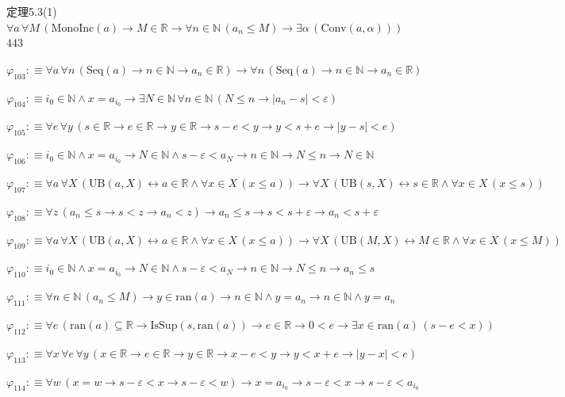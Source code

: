 \begin{fullproof}{定理5.3(1)}{$\forall a\,\forall M\,(\mathrm{MonoInc}(a) \to M \in \mathbb{R} \to \forall n \in \mathbb{N}\,(a_{n} \leq M) \to \exists \alpha\,(\mathrm{Conv}(a,\alpha)))$}{443}
\begin{abbrevlist}
\item $\varphi_{103} :\equiv \forall a\,\forall n\,(\mathrm{Seq}(a) \to n \in \mathbb{N} \to a_{n} \in \mathbb{R}) \to \forall n\,(\mathrm{Seq}(a) \to n \in \mathbb{N} \to a_{n} \in \mathbb{R})$
\item $\varphi_{104} :\equiv i_{0} \in \mathbb{N} \land x = a_{i_{0}} \to \exists N \in \mathbb{N}\,\forall n \in \mathbb{N}\,(N \leq n \to \lvert a_{n} - s \rvert < \varepsilon)$
\item $\varphi_{105} :\equiv \forall e\,\forall y\,(s \in \mathbb{R} \to e \in \mathbb{R} \to y \in \mathbb{R} \to s - e < y \to y < s + e \to \lvert y - s \rvert < e)$
\item $\varphi_{106} :\equiv i_{0} \in \mathbb{N} \land x = a_{i_{0}} \to N \in \mathbb{N} \land s - \varepsilon < a_{N} \to n \in \mathbb{N} \to N \leq n \to N \in \mathbb{N}$
\item $\varphi_{107} :\equiv \forall a\,\forall X\,(\mathrm{UB}(a,X) \leftrightarrow a \in \mathbb{R} \land \forall x \in X\,(x \leq a)) \to \forall X\,(\mathrm{UB}(s,X) \leftrightarrow s \in \mathbb{R} \land \forall x \in X\,(x \leq s))$
\item $\varphi_{108} :\equiv \forall z\,(a_{n} \leq s \to s < z \to a_{n} < z) \to a_{n} \leq s \to s < s + \varepsilon \to a_{n} < s + \varepsilon$
\item $\varphi_{109} :\equiv \forall a\,\forall X\,(\mathrm{UB}(a,X) \leftrightarrow a \in \mathbb{R} \land \forall x \in X\,(x \leq a)) \to \forall X\,(\mathrm{UB}(M,X) \leftrightarrow M \in \mathbb{R} \land \forall x \in X\,(x \leq M))$
\item $\varphi_{110} :\equiv i_{0} \in \mathbb{N} \land x = a_{i_{0}} \to N \in \mathbb{N} \land s - \varepsilon < a_{N} \to n \in \mathbb{N} \to N \leq n \to a_{n} \leq s$
\item $\varphi_{111} :\equiv \forall n \in \mathbb{N}\,(a_{n} \leq M) \to y \in \mathrm{ran}(a) \to n \in \mathbb{N} \land y = a_{n} \to n \in \mathbb{N} \land y = a_{n}$
\item $\varphi_{112} :\equiv \forall e\,(\mathrm{ran}(a) \subseteq \mathbb{R} \to \mathrm{IsSup}(s,\mathrm{ran}(a)) \to e \in \mathbb{R} \to 0 < e \to \exists x \in \mathrm{ran}(a)\,(s - e < x))$
\item $\varphi_{113} :\equiv \forall x\,\forall e\,\forall y\,(x \in \mathbb{R} \to e \in \mathbb{R} \to y \in \mathbb{R} \to x - e < y \to y < x + e \to \lvert y - x \rvert < e)$
\item $\varphi_{114} :\equiv \forall w\,(x = w \to s - \varepsilon < x \to s - \varepsilon < w) \to x = a_{i_{0}} \to s - \varepsilon < x \to s - \varepsilon < a_{i_{0}}$

\end{abbrevlist}
\end{fullproof}

